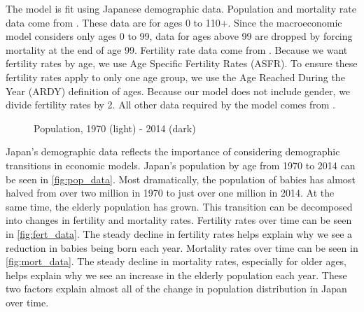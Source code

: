 \documentclass[10pt]{article}
\renewcommand{\thesection}{\arabic{section}}
\renewcommand{\section}[2][]{\oldsection[#1]{#2}\index{#1}\label{sec:\thesection}}
\numberwithin{equation}{subsection}
\newcommand*{\FigureDir}{../../graphs}
\begin{document}
\section{Data}

\par The model is fit using Japanese demographic data. Population and mortality rate data come from \cite{JMD2018}. These data are for ages 0 to 110+. Since the macroeconomic model considers only ages 0 to 99, data for ages above 99 are dropped by forcing mortality at the end of age 99. Fertility rate data come from \cite{HFC2018}. Because we want fertility rates by age, we use Age Specific Fertility Rates (ASFR). To ensure these fertility rates apply to only one age group, we use the Age Reached During the Year (ARDY) definition of ages. Because our model does not include gender, we divide fertility rates by 2. All other data required by the model comes from \cite{E2020}.

\begin{figure}[!ht]
   \centering
   \caption{\label{fig:pop_data}Population, 1970 (light) - 2014 (dark)}
\end{figure}

\par Japan's demographic data reflects the importance of considering demographic transitions in economic models. Japan's population by age from 1970 to 2014 can be seen in \autoref{fig:pop_data}. Most dramatically, the population of babies has almost halved from over two million in 1970 to just over one million in 2014. At the same time, the elderly population has grown. This transition can be decomposed into changes in fertility and mortality rates. Fertility rates over time can be seen in \autoref{fig:fert_data}. The steady decline in fertility rates helps explain why we see a reduction in babies being born each year. Mortality rates over time can be seen in \autoref{fig:mort_data}. The steady decline in mortality rates, especially for older ages, helps explain why we see an increase in the elderly population each year. These two factors explain almost all of the change in population distribution in Japan over time.
\end{document}
